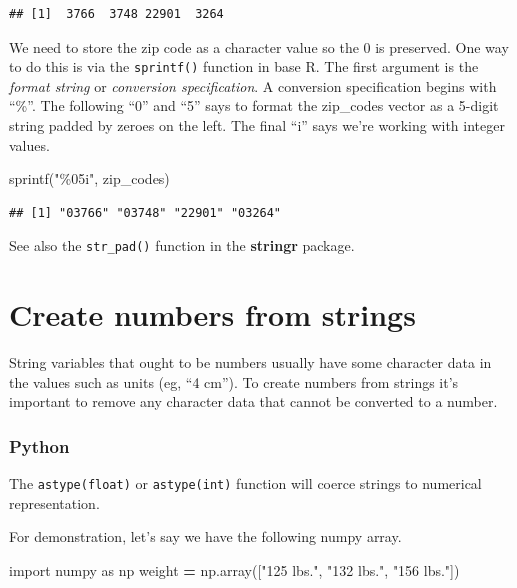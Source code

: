 \documentclass[
]{book}
\newenvironment{Shaded}{\begin{snugshade}}{\end{snugshade}}
\newcommand{\FunctionTok}[1]{\textcolor[rgb]{0.00,0.00,0.00}{#1}}
\newcommand{\ImportTok}[1]{#1}
\newcommand{\NormalTok}[1]{#1}
\newcommand{\OperatorTok}[1]{\textcolor[rgb]{0.81,0.36,0.00}{\textbf{#1}}}
\newcommand{\StringTok}[1]{\textcolor[rgb]{0.31,0.60,0.02}{#1}}
\begin{document}
\begin{verbatim}
## [1]  3766  3748 22901  3264
\end{verbatim}

We need to store the zip code as a character value so the 0 is preserved. One way to do this is via the \texttt{sprintf()} function in base R. The first argument is the \emph{format string} or \emph{conversion specification}. A conversion specification begins with ``\%''. The following ``0'' and ``5'' says to format the zip\_codes vector as a 5-digit string padded by zeroes on the left. The final ``i'' says we're working with integer values.

\begin{Shaded}
\begin{Highlighting}[]
\FunctionTok{sprintf}\NormalTok{(}\StringTok{"\%05i"}\NormalTok{, zip\_codes)}
\end{Highlighting}
\end{Shaded}

\begin{verbatim}
## [1] "03766" "03748" "22901" "03264"
\end{verbatim}

See also the \texttt{str\_pad()} function in the \textbf{stringr} package.

\hypertarget{create-numbers-from-strings}{%
\section{Create numbers from strings}\label{create-numbers-from-strings}}

String variables that ought to be numbers usually have some character data in the values such as units (eg, ``4 cm''). To create numbers from strings it's important to remove any character data that cannot be converted to a number.

\hypertarget{python-23}{%
\subsubsection*{Python}\label{python-23}}

The \texttt{astype(float)} or \texttt{astype(int)} function will coerce strings to numerical representation.

For demonstration, let's say we have the following numpy array.

\begin{Shaded}
\begin{Highlighting}[]
\ImportTok{import}\NormalTok{ numpy }\ImportTok{as}\NormalTok{ np}
\NormalTok{weight }\OperatorTok{=}\NormalTok{ np.array([}\StringTok{"125 lbs."}\NormalTok{, }\StringTok{"132 lbs."}\NormalTok{, }\StringTok{"156 lbs."}\NormalTok{])}
\end{Highlighting}
\end{Shaded}
\end{document}

